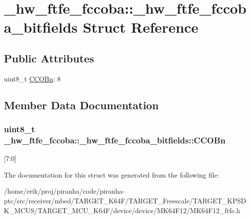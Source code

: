 \hypertarget{struct__hw__ftfe__fccoba_1_1__hw__ftfe__fccoba__bitfields}{}\section{\+\_\+hw\+\_\+ftfe\+\_\+fccoba\+:\+:\+\_\+hw\+\_\+ftfe\+\_\+fccoba\+\_\+bitfields Struct Reference}
\label{struct__hw__ftfe__fccoba_1_1__hw__ftfe__fccoba__bitfields}
\subsection*{Public Attributes}
\begin{DoxyCompactItemize}
\item 
uint8\+\_\+t \hyperlink{struct__hw__ftfe__fccoba_1_1__hw__ftfe__fccoba__bitfields_aaaa2464b14d3a85bdb09b2bff449a4c9}{C\+C\+O\+Bn}\+: 8
\end{DoxyCompactItemize}


\subsection{Member Data Documentation}
\subsubsection[{\texorpdfstring{C\+C\+O\+Bn}{CCOBn}}]{\setlength{\rightskip}{0pt plus 5cm}uint8\+\_\+t \+\_\+hw\+\_\+ftfe\+\_\+fccoba\+::\+\_\+hw\+\_\+ftfe\+\_\+fccoba\+\_\+bitfields\+::\+C\+C\+O\+Bn}\hypertarget{struct__hw__ftfe__fccoba_1_1__hw__ftfe__fccoba__bitfields_aaaa2464b14d3a85bdb09b2bff449a4c9}{}\label{struct__hw__ftfe__fccoba_1_1__hw__ftfe__fccoba__bitfields_aaaa2464b14d3a85bdb09b2bff449a4c9}
\mbox{[}7\+:0\mbox{]} 

The documentation for this struct was generated from the following file\+:\begin{DoxyCompactItemize}
\item 
/home/erik/proj/piranha/code/piranha-\/ptc/src/receiver/mbed/\+T\+A\+R\+G\+E\+T\+\_\+\+K64\+F/\+T\+A\+R\+G\+E\+T\+\_\+\+Freescale/\+T\+A\+R\+G\+E\+T\+\_\+\+K\+P\+S\+D\+K\+\_\+\+M\+C\+U\+S/\+T\+A\+R\+G\+E\+T\+\_\+\+M\+C\+U\+\_\+\+K64\+F/device/device/\+M\+K64\+F12/M\+K64\+F12\+\_\+ftfe.\+h\end{DoxyCompactItemize}
